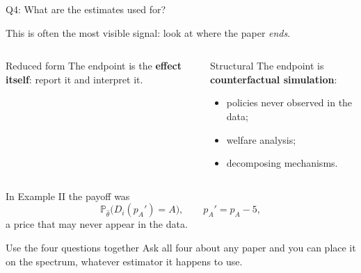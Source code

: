 \documentclass[aspectratio=169,11pt]{beamer}
\newcommand{\Pp}{\mathbb{P}}
\begin{document}
\begin{frame}{Q4: What are the estimates used for?}

This is often the most visible signal: look at where the paper \emph{ends}.

\vspace{0.3em}

\begin{columns}[T]

\begin{block}{Reduced form}
The endpoint is the \textbf{effect itself}:
report it and interpret it.
\end{block}

\begin{block}{Structural}
The endpoint is \textbf{counterfactual simulation}:
\begin{itemize}
    \item policies never observed in the data;
    \item welfare analysis;
    \item decomposing mechanisms.
\end{itemize}
\end{block}

\end{columns}

\vspace{0.5em}

In Example II the payoff was
\[
\Pp_{\hat\theta}\bigl(D_i(p_A')=A\bigr),
\qquad
p_A'=p_A-5,
\]
a price that may never appear in the data.

\vspace{0.3em}

\begin{alertblock}{Use the four questions together}
Ask all four about any paper and you can place it on the spectrum,
whatever estimator it happens to use.
\end{alertblock}

\end{frame}
\end{document}
